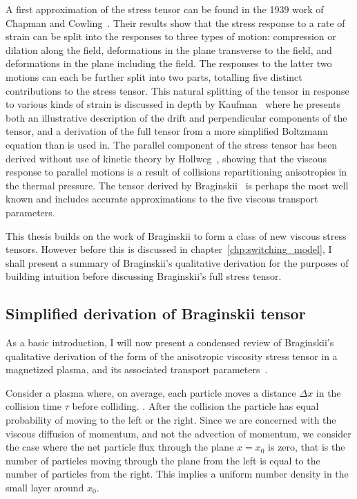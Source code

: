 A first approximation of the stress tensor can be found in the 1939 work of Chapman and Cowling~\cite{chapmanMathematicalTheoryNonuniform1970}. Their results show that the stress response to a rate of strain can be split into the responses to three types of motion: compression or dilation along the field, deformations in the plane transverse to the field, and deformations in the plane including the field. The responses to the latter two motions can each be further split into two parts, totalling five distinct contributions to the stress tensor. This natural splitting of the tensor in response to various kinds of strain is discussed in depth by Kaufman~\cite{kaufmanPlasmaViscosityMagnetic1960} where he presents both an illustrative description of the drift and perpendicular components of the tensor, and a derivation of the full tensor from a more simplified Boltzmann equation than is used in\cite{chapmanMathematicalTheoryNonuniform1970}. The parallel component of the stress tensor has been derived without use of kinetic theory by Hollweg~\cite{hollwegViscosityMagnetizedPlasma1985}, showing that the viscous response to parallel motions is a result of collisions repartitioning anisotropies in the thermal pressure. The tensor derived by Braginskii~\cite{braginskiiTransportProcessesPlasma1965} is perhaps the most well known and includes accurate approximations to the five viscous transport parameters.

This thesis builds on the work of Braginskii to form a class of new viscous stress tensors. However before this is discussed in chapter~\ref{chp:switching_model}, I shall present a summary of Braginskii's qualitative derivation for the purposes of building intuition before discussing Braginskii's full stress tensor.

\subsection{Simplified derivation of Braginskii tensor}

As a basic introduction, I will now present a condensed review of Braginskii's qualitative derivation of the form of the anisotropic viscosity stress tensor in a magnetized plasma, and its associated transport parameters~\cite{braginskiiTransportProcessesPlasma1965}. 

Consider a plasma where, on average, each particle moves a distance $\Delta x$ in the collision time $\tau$ before colliding. . After the collision the particle has equal probability of moving to the left or the right. Since we are concerned with the viscous diffusion of momentum, and not the advection of momentum, we consider the case where the net particle flux through the plane $x=x_0$ is zero, that is the number of particles moving through the plane from the left is equal to the number of particles from the right. This implies a uniform number density in the small layer around $x_0$.

